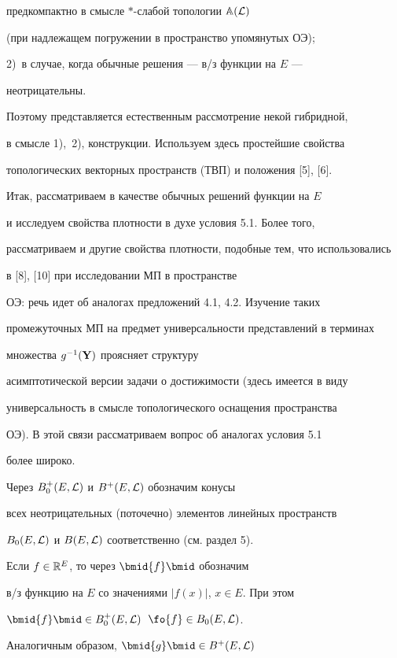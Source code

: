 предкомпактно в смысле $*$-слабой топологии ${\Bbb A}({\cal L})$


(при надлежащем погружении в пространство упомянутых ОЭ);


2)~в случае, когда обычные решения --- в/з функции на $E$ ---


неотрицательны.


Поэтому представляется естественным рассмотрение некой гибридной,


в смысле 1),~2), конструкции. Используем здесь простейшие свойства


топологических векторных пространств (ТВП) и положения [5], [6].


Итак, рассматриваем в качестве обычных решений функции на $E$


и исследуем свойства плотности в духе условия 5.1. Более того,


рассматриваем и другие свойства плотности, подобные тем, что использовались


в [8], [10] при исследовании МП в пространстве


ОЭ: речь идет об аналогах предложений 4.1, 4.2. Изучение таких


промежуточных МП на предмет универсальности представлений в терминах


множества ${g^{-1}}({\bold Y})$ проясняет структуру


асимптотической версии задачи о достижимости (здесь имеется в виду


универсальность в смысле топологического оснащения пространства


ОЭ). В этой связи рассматриваем вопрос об аналогах условия 5.1


более широко.





Через ${B_0^+}(E,{\cal L})$ и ${B^+}(E,{\cal L})$ обозначим конусы


всех неотрицательных (поточечно) элементов линейных пространств


${B_0}(E,{\cal L})$ и $B(E,{\cal L})$ соответственно (см. раздел 5).


Если $f \in {{\Bbb R}^E}$, то через $\bmid{f}\bmid$ обозначим


в/з функцию на $E$ со значениями $|{f(x)}|$, $x \in E$. При этом


$\bmid{f}\bmid \in {B_0^+}(E,{\cal L})$\, $\fo{f} \in {B_0}(E,{\cal L})$.


Аналогичным образом, $\bmid{g}\bmid \in {B^+}(E,{\cal L})$\,


